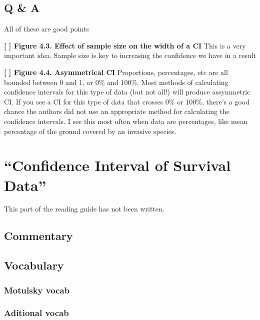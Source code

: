 \documentclass[]{book}
\theoremstyle{definition}
\theoremstyle{definition}
\theoremstyle{definition}
\theoremstyle{remark}
\begin{document}
\section{Q \& A}\label{q-a}

All of these are good points

\textbf{{[} {]} Figure 4.3. Effect of sample size on the width of a CI}
This is a very important idea. Sample size is key to increasing the
confidence we have in a result

\textbf{{[} {]} Figure 4.4. Asymmetrical CI} Proportions, percentages,
etc are all bounded between 0 and 1, or 0\% and 100\%. Most methods of
calculating confidence intervals for this type of data (but not all!)
will produce assymmetric CI. If you see a CI for this type of data that
crosses 0\% or 100\%, there's a good chance the authors did not use an
appropriate method for calculating the confidence intervals. I see this
most often when data are percentages, like mean percentage of the ground
covered by an invasive species.

\chapter{\texorpdfstring{``Confidence Interval of Survival
Data''}{Confidence Interval of Survival Data}}\label{ch5}

This part of the reading guide has not been written.

\section*{Commentary}\label{commentary-3}

\section*{Vocabulary}\label{vocabulary-4}

\subsection*{Motulsky vocab}\label{motulsky-vocab-4}

\subsection*{Aditional vocab}\label{aditional-vocab-2}
\end{document}
